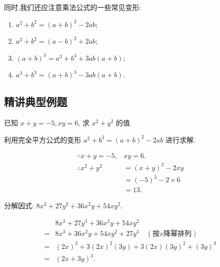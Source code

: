 同时,我们还应注意乘法公式的一些常见变形:
\begin{enumerate}
	\item $a^2+b^2=(a+b)^2-2 a b$;
	\item $a^2+b^2=(a-b)^2+2 a b$;
	\item $(a+b)^3=a^3+b^3+3 a b(a+b)$;
	\item $a^3+b^3=(a+b)^3-3 a b(a+b)$.
\end{enumerate}

\subsection{精讲典型例题}
\begin{example}
	已知 $x+y=-5, xy=6$, 求 $x^2+y^2$ 的值.
\end{example}
\begin{analysis}
	利用完全平方公式的变形 $a^2+b^2=(a+b)^2-2 a b$ 进行求解.
\end{analysis}
\begin{solution}
	\begin{align*}
		\because x+y=-5,   & x y=6.             \\
		\therefore x^2+y^2 & =(x+y)^2-2 x y     \\
		                   & =(-5)^2-2 \times 6 \\
		                   & =13 .
	\end{align*}
\end{solution}

\begin{example}
	分解因式: $8 x^3+27 y^3+36 x^2 y+54 x y^2$.
\end{example}
\begin{solution}
	\begin{align}
		  & 8 x^3+27 y^3+36 x^2 y+54 x y^2                                   \\
		= & 8 x^3+36 x^2 y+54 x y^2+27 y^3 \quad (\text{按}x\text{降幂排列}) \\
		= & (2 x)^3+3(2 x)^2(3 y)+3(2 x)(3 y)^2+(3 y)^3                      \\
		= & (2 x+3 y)^3 .
	\end{align}
\end{solution}


